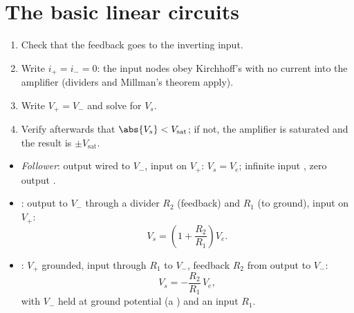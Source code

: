 \section{The basic linear circuits}

\begin{method}\label{met:b1:operational-amplifier:method}
\begin{enumerate}
  \item Check that the feedback goes to the inverting input.
  \item Write $i_+ = i_- = 0$: the input nodes obey Kirchhoff's  with no current into the amplifier (dividers and Millman's
        theorem apply).
  \item Write $V_+ = V_-$ and solve for $V_s$.
  \item Verify afterwards that $\abs{V_s} < V_{\mathrm{sat}}$; if not,
        the amplifier is saturated and the result is $\pm V_{\mathrm{sat}}$.
\end{enumerate}
\end{method}

\begin{proposition}\label{prop:b1:operational-amplifier:basic}
\begin{itemize}
  \item \emph{Follower}: output wired to $V_-$, input on $V_+$:
        $V_s = V_e$; infinite input , zero output .
  \item \emph{}: output to $V_-$ through a
        divider $R_2$ (feedback) and $R_1$ (to ground), input on $V_+$:
        \[
        V_s = \left(1 + \frac{R_2}{R_1}\right)V_e .
        \]
  \item \emph{}: $V_+$ grounded, input through
        $R_1$ to $V_-$, feedback $R_2$ from output to $V_-$:
        \[
        V_s = -\frac{R_2}{R_1}\,V_e ,
        \]
        with $V_-$ held at ground potential (a \emph{})
        and an input  $R_1$.
\end{itemize}
\end{proposition}

